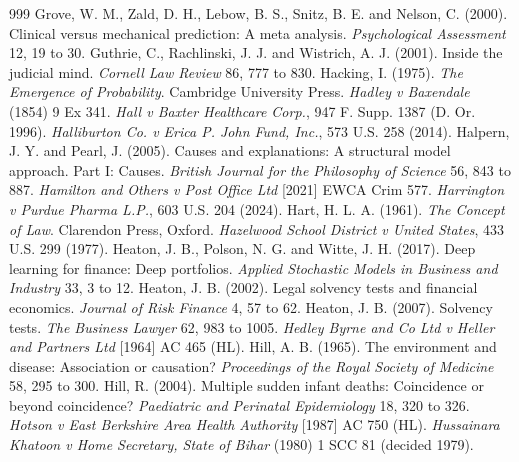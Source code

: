 \begin{thebibliography}{999}
 Grove, W. M., Zald, D. H., Lebow, B. S., Snitz, B. E. and Nelson, C. (2000). Clinical versus mechanical prediction: A meta analysis. \emph{Psychological Assessment} 12, 19 to 30.
 Guthrie, C., Rachlinski, J. J. and Wistrich, A. J. (2001). Inside the judicial mind. \emph{Cornell Law Review} 86, 777 to 830.
 Hacking, I. (1975). \emph{The Emergence of Probability}. Cambridge University Press.
 \emph{Hadley v Baxendale} (1854) 9 Ex 341.
 \emph{Hall v Baxter Healthcare Corp.}, 947 F. Supp. 1387 (D. Or. 1996).
 \emph{Halliburton Co. v Erica P. John Fund, Inc.}, 573 U.S. 258 (2014).
 Halpern, J. Y. and Pearl, J. (2005). Causes and explanations: A structural model approach. Part I: Causes. \emph{British Journal for the Philosophy of Science} 56, 843 to 887.
 \emph{Hamilton and Others v Post Office Ltd} [2021] EWCA Crim 577.
 \emph{Harrington v Purdue Pharma L.P.}, 603 U.S. 204 (2024).
 Hart, H. L. A. (1961). \emph{The Concept of Law}. Clarendon Press, Oxford.
 \emph{Hazelwood School District v United States}, 433 U.S. 299 (1977).
 Heaton, J. B., Polson, N. G. and Witte, J. H. (2017). Deep learning for finance: Deep portfolios. \emph{Applied Stochastic Models in Business and Industry} 33, 3 to 12.
 Heaton, J. B. (2002). Legal solvency tests and financial economics. \emph{Journal of Risk Finance} 4, 57 to 62.
 Heaton, J. B. (2007). Solvency tests. \emph{The Business Lawyer} 62, 983 to 1005.
 \emph{Hedley Byrne and Co Ltd v Heller and Partners Ltd} [1964] AC 465 (HL).
 Hill, A. B. (1965). The environment and disease: Association or causation? \emph{Proceedings of the Royal Society of Medicine} 58, 295 to 300.
 Hill, R. (2004). Multiple sudden infant deaths: Coincidence or beyond coincidence? \emph{Paediatric and Perinatal Epidemiology} 18, 320 to 326.
 \emph{Hotson v East Berkshire Area Health Authority} [1987] AC 750 (HL).
 \emph{Hussainara Khatoon v Home Secretary, State of Bihar} (1980) 1 SCC 81 (decided 1979).

\end{thebibliography}
